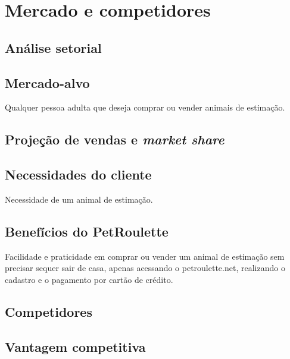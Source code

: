 \chapter{Mercado e competidores} 


\section{Análise setorial}


\section{Mercado-alvo}
	Qualquer pessoa adulta que deseja comprar ou vender animais de estimação.

\section{Projeção de vendas e \textit{market share}}

\section{Necessidades do cliente}
	Necessidade de um animal de estimação.

\section{Benefícios do PetRoulette}
	Facilidade e praticidade em comprar ou vender um animal de estimação sem precisar sequer sair de casa, apenas acessando o petroulette.net, realizando o cadastro e o pagamento por cartão de crédito.


\section{Competidores}

\section{Vantagem competitiva}
